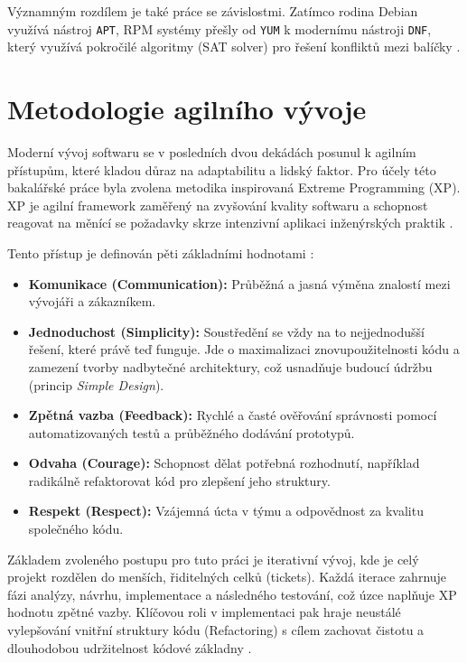 Významným rozdílem je také práce se závislostmi. Zatímco rodina Debian využívá nástroj \texttt{APT}, RPM systémy přešly od \texttt{YUM} k modernímu nástroji \texttt{DNF}, který využívá pokročilé algoritmy (SAT solver) pro řešení konfliktů mezi balíčky \cite{schroeder2008libsolv}.

\section{Metodologie agilního vývoje}
\label{sec:agile_teorie}
Moderní vývoj softwaru se v posledních dvou dekádách posunul k agilním přístupům, které kladou důraz na adaptabilitu a lidský faktor. Pro účely této bakalářské práce byla zvolena metodika inspirovaná Extreme Programming (XP). XP je agilní framework zaměřený na zvyšování kvality softwaru a schopnost reagovat na měnící se požadavky skrze intenzivní aplikaci inženýrských praktik \cite{beck_xp}.

Tento přístup je definován pěti základními hodnotami \cite{beck_xp}:
\begin{itemize}
    \item \textbf{Komunikace (Communication):} Průběžná a jasná výměna znalostí mezi vývojáři a zákazníkem.
    \item \textbf{Jednoduchost (Simplicity):} Soustředění se vždy na to nejjednodušší řešení, které právě teď funguje. Jde o maximalizaci znovupoužitelnosti kódu a zamezení tvorby nadbytečné architektury, což usnadňuje budoucí údržbu (princip \textit{Simple Design}).
    \item \textbf{Zpětná vazba (Feedback):} Rychlé a časté ověřování správnosti pomocí automatizovaných testů a průběžného dodávání prototypů.
    \item \textbf{Odvaha (Courage):} Schopnost dělat potřebná rozhodnutí, například radikálně refaktorovat kód pro zlepšení jeho struktury.
    \item \textbf{Respekt (Respect):} Vzájemná úcta v týmu a odpovědnost za kvalitu společného kódu.
\end{itemize}

Základem zvoleného postupu pro tuto práci je iterativní vývoj, kde je celý projekt rozdělen do menších, řiditelných celků (tickets). Každá iterace zahrnuje fázi analýzy, návrhu, implementace a následného testování, což úzce naplňuje XP hodnotu zpětné vazby. Klíčovou roli v implementaci pak hraje neustálé vylepšování vnitřní struktury kódu (Refactoring) s cílem zachovat čistotu a dlouhodobou udržitelnost kódové základny \cite{beck_xp}.
